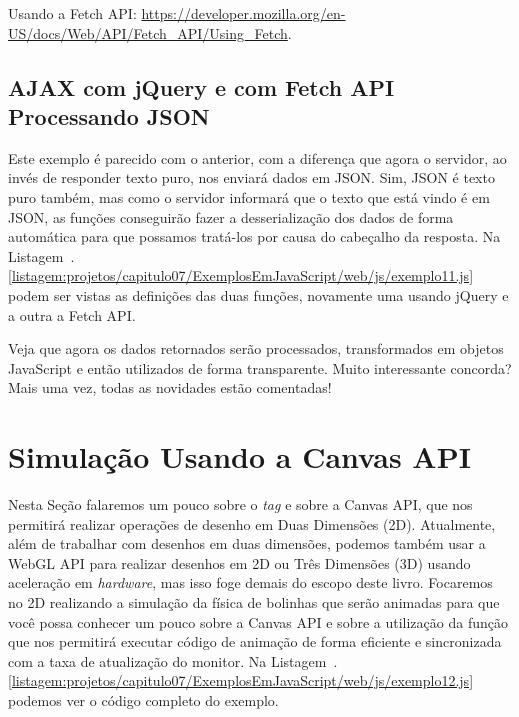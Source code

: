\begin{saibaMais}
    Usando a Fetch API: \url{https://developer.mozilla.org/en-US/docs/Web/API/Fetch_API/Using_Fetch}.
\end{saibaMais}


\subsection{AJAX com jQuery e com Fetch API Processando JSON}

Este exemplo é parecido com o anterior, com a diferença que agora o servidor, ao invés de responder texto puro, nos enviará dados em JSON. Sim, JSON é texto puro também, mas como o servidor informará que o texto que está vindo é em JSON, as funções conseguirão fazer a desserialização dos dados de forma automática para que possamos tratá-los por causa do cabeçalho da resposta. Na Listagem~\thechapter.\ref{listagem:projetos/capitulo07/ExemplosEmJavaScript/web/js/exemplo11.js} podem ser vistas as definições das duas funções, novamente uma usando jQuery e a outra a Fetch API.


Veja que agora os dados retornados serão processados, transformados em objetos JavaScript e então utilizados de forma transparente. Muito interessante concorda? Mais uma vez, todas as novidades estão comentadas!



\section{Simulação Usando a Canvas API}

Nesta Seção falaremos um pouco sobre o \textit{tag}  e sobre a Canvas API, que nos permitirá realizar operações de desenho em Duas Dimensões (2D). Atualmente, além de trabalhar com desenhos em duas dimensões, podemos também usar a WebGL API para realizar desenhos em 2D ou Três Dimensões (3D) usando aceleração em \textit{hardware}, mas isso foge demais do escopo deste livro. Focaremos no 2D realizando a simulação da física de bolinhas que serão animadas para que você possa conhecer um pouco sobre a Canvas API e sobre a utilização da função  que nos permitirá executar código de animação de forma eficiente e sincronizada com a taxa de atualização do monitor. Na Listagem~\thechapter.\ref{listagem:projetos/capitulo07/ExemplosEmJavaScript/web/js/exemplo12.js} podemos ver o código completo do exemplo.

